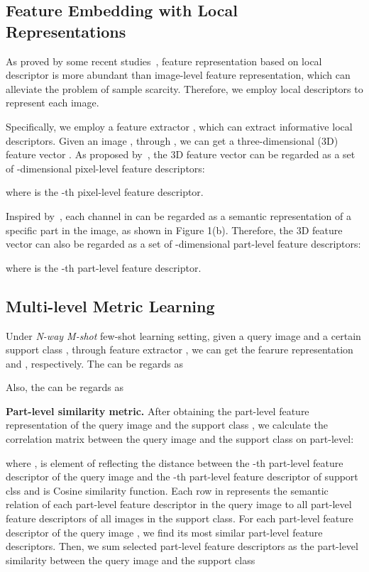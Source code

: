 \documentclass[10pt,twocolumn,letterpaper]{article}
\begin{document}
\subsection{Feature Embedding with Local Representations}
As proved by some recent studies~\cite{li2019distribution,li2019revisiting,chen2020multi}, feature representation based on local descriptor is more abundant than image-level feature representation, which can alleviate the problem of sample scarcity. Therefore, we employ local descriptors to represent each image.

Specifically, we employ a feature extractor , which can extract informative local descriptors. Given an image , through , we can get a three-dimensional (3D) feature vector . As proposed by~\cite{li2019distribution,li2019revisiting,chen2020multi}, the 3D feature vector can be regarded as a set of  -dimensional pixel-level feature descriptors:
 
where  is the -th pixel-level feature descriptor. 

Inspired by~\cite{eccvWooPLK18,cvprHuSS18}, each channel in  can be regarded as a semantic representation of a specific part in the image, as shown in Figure 1(b). Therefore, the 3D feature vector can also be regarded as a set of  -dimensional part-level feature descriptors:
 
where  is the -th part-level feature descriptor. 


\subsection{Multi-level Metric Learning}
Under \emph{N-way M-shot} few-shot learning setting, given a query image  and a certain support class , through feature extractor , we can get the fearure representation  and , respectively. The  can be regards as 

Also, the  can be regards as 



\textbf{Part-level similarity metric.}
After obtaining the part-level feature representation of the query image  and the support class , we calculate the correlation matrix  between the query image and the support class on part-level:

where ,   is  element of  reflecting the distance between the -th part-level feature descriptor of the query image and the -th part-level feature descriptor of support clss and  is Cosine  similarity function. Each row in  represents the semantic relation of each part-level feature descriptor in the query image to all part-level feature descriptors of all images in the support class.
For each part-level feature descriptor  of the query image , we find its  most similar part-level feature descriptors. Then, we sum  selected part-level feature descriptors as the part-level similarity between the query image and the support class
\end{document}
